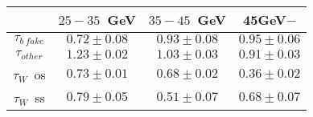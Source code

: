 \centering
\begin{tabular}{|c|c|c|c|} \hline
 & $25-35$~GeV & $35-45$~GeV & 45GeV$-$\\\hline
$\tau_{b~fake}$ & $0.72\pm0.08$ & $0.93\pm0.08$ & $0.95\pm0.06$\\\hline
$\tau_{other}$ & $1.23\pm0.02$ & $1.03\pm0.03$ & $0.91\pm0.03$\\\hline
$\tau_{W}$~os & $0.73\pm0.01$ & $0.68\pm0.02$ & $0.36\pm0.02$\\\hline
$\tau_{W}$~ss & $0.79\pm0.05$ & $0.51\pm0.07$ & $0.68\pm0.07$\\\hline
\end{tabular}
